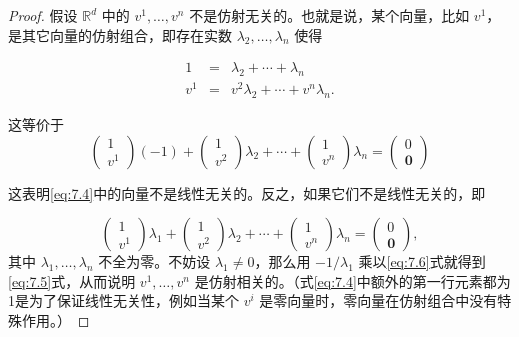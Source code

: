 \begin{proof}
假设 \({\mathbb{R}}^{d}\) 中的 \({v}^{1},\ldots,{v}^{n}\) 不是仿射无关的。也就是说，某个向量，比如 \({v}^{1}\)，是其它向量的仿射组合，即存在实数 \({\lambda }_{2},\ldots,{\lambda }_{n}\) 使得

\begin{eqnarray*}
1 &=& {\lambda }_{2} + \cdots  + {\lambda }_{n}\\
{v}^{1} &=& {v}^{2}{\lambda }_{2} + \cdots  + {v}^{n}{\lambda }_{n}.
\end{eqnarray*}

这等价于
\begin{equation}
\left( \begin{matrix} 1 \\  {v}^{1} \end{matrix}\right) \left( {-1}\right)  + \left( \begin{matrix} 1 \\  {v}^{2} \end{matrix}\right) {\lambda }_{2} + \cdots  + \left( \begin{matrix} 1 \\  {v}^{n} \end{matrix}\right) {\lambda }_{n} = \left( \begin{array}{l} 0 \\  \mathbf{0} \end{array}\right)\label{eq:7.5}
\end{equation}

这表明\eqref{eq:7.4}中的向量不是线性无关的。反之，如果它们不是线性无关的，即

\begin{equation}
\left( \begin{matrix} 1 \\  {v}^{1} \end{matrix}\right) {\lambda }_{1} + \left( \begin{matrix} 1 \\  {v}^{2} \end{matrix}\right) {\lambda }_{2} + \cdots  + \left( \begin{matrix} 1 \\  {v}^{n} \end{matrix}\right) {\lambda }_{n} = \left( \begin{array}{l} 0 \\  \mathbf{0} \end{array}\right),\label{eq:7.6}
\end{equation}
其中 \({\lambda }_{1},\ldots,{\lambda }_{n}\) 不全为零。不妨设 \({\lambda }_{1} \neq  0\)，那么用 \(- 1/{\lambda }_{1}\) 乘以\eqref{eq:7.6}式就得到\eqref{eq:7.5}式，从而说明 \({v}^{1},\ldots,{v}^{n}\) 是仿射相关的。（式\eqref{eq:7.4}中额外的第一行元素都为1是为了保证线性无关性，例如当某个 \({v}^{i}\) 是零向量时，零向量在仿射组合中没有特殊作用。）
\end{proof}

